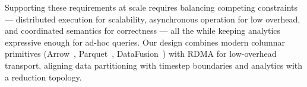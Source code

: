 Supporting these requirements at scale requires balancing competing constraints ---
distributed execution for scalability, asynchronous operation for low overhead, and coordinated semantics for correctness ---
all the while keeping analytics expressive enough for ad-hoc queries.
Our design combines modern columnar primitives (Arrow~\cite{:ApacheArrow}, Parquet~\cite{:ApacheParquet},
DataFusion~\cite{Lamb2024:DataFusion}) with RDMA for low-overhead transport, aligning data
partitioning with timestep boundaries and analytics with a reduction topology.






